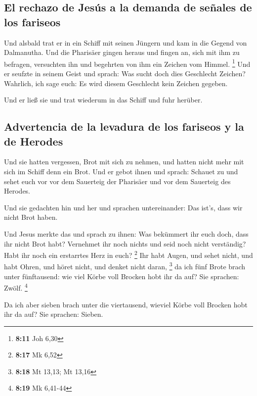 \hypertarget{el-rechazo-de-jesuxfas-a-la-demanda-de-seuxf1ales-de-los-fariseos}{%
\subsection{El rechazo de Jesús a la demanda de señales de los
fariseos}\label{el-rechazo-de-jesuxfas-a-la-demanda-de-seuxf1ales-de-los-fariseos}}

 Und alsbald trat er in ein Schiff mit seinen Jüngern und
kam in die Gegend von Dalmanutha.  Und die Pharisäer
gingen heraus und fingen an, sich mit ihm zu befragen, versuchten ihn
und begehrten von ihm ein Zeichen vom Himmel. \footnote{\textbf{8:11}
  Joh 6,30}  Und er seufzte in seinem Geist und sprach:
Was sucht doch dies Geschlecht Zeichen? Wahrlich, ich sage euch: Es wird
diesem Geschlecht kein Zeichen gegeben.

 Und er ließ sie und trat wiederum in das Schiff und fuhr
herüber.

\hypertarget{advertencia-de-la-levadura-de-los-fariseos-y-la-de-herodes}{%
\subsection{Advertencia de la levadura de los fariseos y la de
Herodes}\label{advertencia-de-la-levadura-de-los-fariseos-y-la-de-herodes}}

 Und sie hatten vergessen, Brot mit sich zu nehmen, und
hatten nicht mehr mit sich im Schiff denn ein Brot.  Und
er gebot ihnen und sprach: Schauet zu und sehet euch vor vor dem
Sauerteig der Pharisäer und vor dem Sauerteig des Herodes.

 Und sie gedachten hin und her und sprachen
untereinander: Das ist's, dass wir nicht Brot haben.

 Und Jesus merkte das und sprach zu ihnen: Was bekümmert
ihr euch doch, dass ihr nicht Brot habt? Vernehmet ihr noch nichts und
seid noch nicht verständig? Habt ihr noch ein erstarrtes Herz in euch?
\footnote{\textbf{8:17} Mk 6,52}  Ihr habt Augen, und
sehet nicht, und habt Ohren, und höret nicht, und denket nicht daran,
\footnote{\textbf{8:18} Mt 13,13; Mt 13,16}  da ich fünf
Brote brach unter fünftausend: wie viel Körbe voll Brocken hobt ihr da
auf? Sie sprachen: Zwölf. \footnote{\textbf{8:19} Mk 6,41-44}

 Da ich aber sieben brach unter die viertausend, wieviel
Körbe voll Brocken hobt ihr da auf? Sie sprachen: Sieben.

